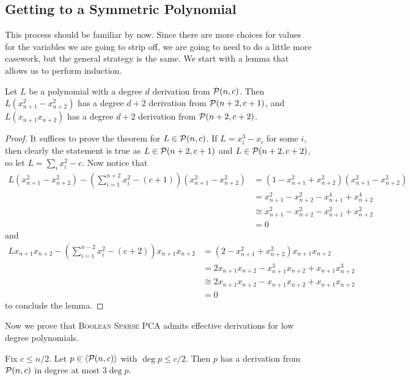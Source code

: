\subsection{Getting to a Symmetric Polynomial}
This process should be familiar by now. Since there are more choices for values for the variables we are going to strip off, we are going to need to do a little more casework, but the general strategy is the same. We start with a lemma that allows us to perform induction.
\begin{lemma}\label{lem:bcpa-induct}
Let $L$ be a polynomial with a degree $d$ derivation from $\mathcal P(n,c)$. Then $L(x_{n+1}^2-x_{n+2}^2)$ has a degree $d+2$ derivation from $\mathcal P(n+2,c+1)$, and $L(x_{n+1}x_{n+2})$ has a degree $d+2$ derivation from $\mathcal P(n+2,c+2)$.
\end{lemma}
\begin{proof}
It suffices to prove the theorem for $L \in \mathcal P(n,c)$. If $L = x_i^3 - x_i$ for some $i$, then clearly the statement is true as $L \in \mathcal P(n+2,c+1)$ and $L \in \mathcal P(n+2,c+2)$, so let $L = \sum_i x_i^2 - c$. Now notice that 
\begin{align*}
L(x_{n+1}^2 - x_{n+2}^2) - \left(\sum_{i=1}^{n+2} x_i^2 - (c+1)\right)(x_{n+1}^2-x_{n+2}^2) &= (1-x_{n+1}^2+x_{n+2}^2)(x_{n+1}^2-x_{n+2}^2) \\
&= x_{n+1}^2 - x_{n+2}^2 - x_{n+1}^4 + x_{n+2}^4  \\
&\cong x_{n+1}^2 - x_{n+2}^2 - x_{n+1}^2 + x_{n+2}^2 \\
&= 0
\end{align*}
and 
\begin{align*}
Lx_{n+1}x_{n+2} - \left(\sum_{i=1}^{n-2} x_i^2 - (c+2)\right)x_{n+1}x_{n+2} &= (2-x_{n+1}^2 + x_{n+2}^2)x_{n+1}x_{n+2} \\
&= 2x_{n+1}x_{n+2} - x_{n+1}^3x_{n+2} + x_{n+1}x_{n+2}^3 \\
&\cong 2x_{n+1}x_{n+2} - x_{n+1}x_{n+2} + x_{n+1}x_{n+2} \\
&= 0
\end{align*}
to conclude the lemma. 
\end{proof}
Now we prove that \textsc{Boolean Sparse PCA} admits effective derivations for low degree polynomials.
\begin{lemma}
Fix $c \leq n/2$. Let $p \in \langle \mathcal P(n,c) \rangle$ with $\deg p \leq c/2$. Then $p$ has a derivation from $\mathcal P(n,c)$ in degree at most $3\deg p$.
\end{lemma}

